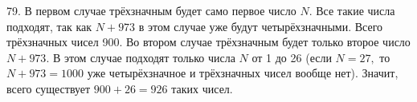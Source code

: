 79. В первом случае трёхзначным будет само первое число $N.$ Все такие числа подходят, так как $N+973$ в этом случае уже будут четырёхзначными. Всего трёхзначных чисел 900. Во втором случае трёхзначным будет только второе число $N+973.$ В этом случае подходят только числа $N$ от 1 до 26 (если $N=27,$ то $N+973=1000$ уже четырёхзначное и трёхзначных чисел вообще нет). Значит, всего существует $900+26=926$ таких чисел.\\
